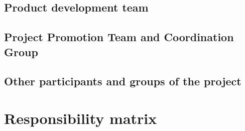 \subsection{Product development team}



\subsection{Project Promotion Team and Coordination Group}



\subsection{Other participants and groups of the project}


\section{Responsibility matrix}

